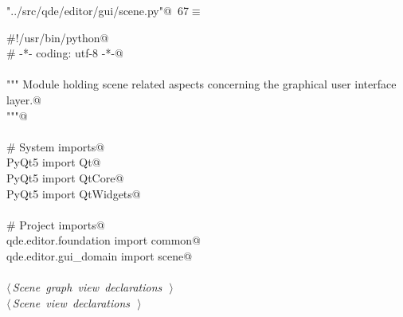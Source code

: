 \documentclass[
    a4paper,      %
    10pt,         %
    openright,    %
    notitlepage,  %
    parskip=half, %
]{scrreprt}       %
\theoremstyle{definition}                    %
\begin{document}
\begin{flushleft} \small
\begin{minipage}{\linewidth}\label{scrap115}\raggedright\small
{} \verb@"../src/qde/editor/gui/scene.py"@\nobreak\ {\footnotesize {67}}$\equiv$
\vspace{-1ex}
\begin{list}{}{} \item
\mbox{}\lstinline@#!/usr/bin/python@\\
\mbox{}\lstinline@# -*- coding: utf-8 -*-@\\
\mbox{}\lstinline@@\\
\mbox{}\lstinline@""" Module holding scene related aspects concerning the graphical user interface layer.@\\
\mbox{}\lstinline@"""@\\
\mbox{}\lstinline@@\\
\mbox{}\lstinline@# System imports@\\
\mbox{}\lstinline@from PyQt5 import Qt@\\
\mbox{}\lstinline@from PyQt5 import QtCore@\\
\mbox{}\lstinline@from PyQt5 import QtWidgets@\\
\mbox{}\lstinline@@\\
\mbox{}\lstinline@# Project imports@\\
\mbox{}\lstinline@from qde.editor.foundation import common@\\
\mbox{}\lstinline@from qde.editor.gui_domain import scene@\\
\mbox{}\lstinline@@\\
\mbox{}\lstinline@@\hbox{$\langle\,${\itshape Scene graph view declarations}\nobreak\ {\footnotesize {}}$\,\rangle$}\lstinline@@\\
\mbox{}\lstinline@@\hbox{$\langle\,${\itshape Scene view declarations}\nobreak\ {\footnotesize {}}$\,\rangle$}\lstinline@@\\
\mbox{}\lstinline@@{\NWsep}
\end{list}
\vspace{-1.5ex}
\footnotesize
\begin{list}{}{\setlength{\itemsep}{-\parsep}\setlength{\itemindent}{-\leftmargin}}

\item{}
\end{list}
\end{minipage}\vspace{4ex}
\end{flushleft}
\end{document}
